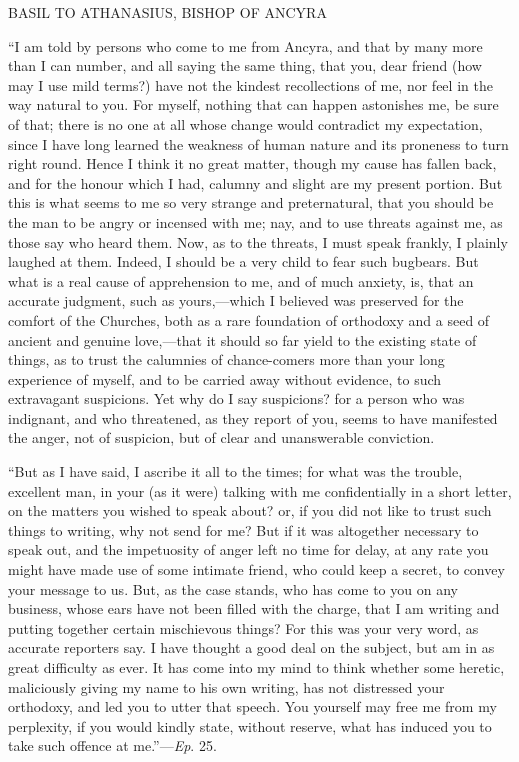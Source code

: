 BASIL TO ATHANASIUS, BISHOP OF ANCYRA

``I am told by persons who come to me from Ancyra, and that by
many more than I can number, and all saying the same thing, that you,
dear friend (how may I use mild terms?) have not the kindest
recollections of me, nor feel in the way natural to you. For myself,
nothing that can happen astonishes me, be sure of that; there is no
one at all whose change would contradict my expectation, since I have
long learned the weakness of human nature and its proneness to turn
right round. Hence I think it no great matter, though my cause has
fallen back, and for the honour which I had, calumny and slight are my
present portion. But this is what seems to me so very strange and
preternatural, that you should be the man to be angry or incensed with
me; nay, and to use threats against me, as those say who heard them.
Now, as to the threats, I must speak frankly, I plainly laughed at
them. Indeed, I should be a very child to fear such bugbears. But what
is a real cause of apprehension to me, and of much anxiety, is, that
an accurate judgment, such as yours,—which I believed was preserved
for the comfort of the Churches, both as a rare foundation of
orthodoxy and a seed of ancient and genuine love,—that it should so
far yield to the existing state of things, as to trust the calumnies
of chance-comers more than your long experience of myself, and to be
carried away without evidence, to such extravagant suspicions. Yet why
do I say suspicions? for a person who was indignant, and who
threatened, as they report of you, seems to have manifested the anger,
not of suspicion, but of clear and unanswerable conviction.

``But as I have said, I ascribe it all to the times; for what
was the trouble, excellent man, in your (as it were) talking with me
confidentially in a short letter, on the matters you wished to speak
about? or, if you did not like to trust such things to writing, why
not send for me? But if it was altogether necessary to speak out, and
the impetuosity of anger left no time for delay, at any rate you might
have made use of some intimate friend, who could keep a secret, to
convey your message to us. But, as the case stands, who has come to
you on any business, whose ears have not been filled with the charge,
that I am writing and putting together certain mischievous things? For
this was your very word, as accurate reporters say. I have thought a
good deal on the subject, but am in as great difficulty as ever. It
has come into my mind to think whether some heretic, maliciously
giving my name to his own writing, has not distressed your
orthodoxy, and led you to utter that speech. You yourself may free me
from my perplexity, if you would kindly state, without reserve, what
has induced you to take such offence at me.''—\emph{Ep}. 25.

